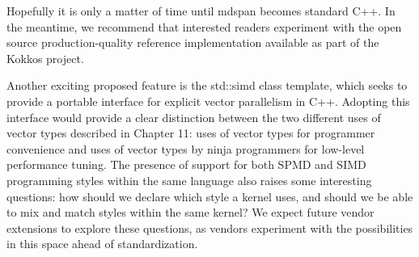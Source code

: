 Hopefully it is only a matter of time until mdspan becomes standard C++. In the meantime, we recommend that interested readers experiment with the open source production-quality reference implementation available as part of the Kokkos project.\par

Another exciting proposed feature is the std::simd class template, which seeks to provide a portable interface for explicit vector parallelism in C++. Adopting this interface would provide a clear distinction between the two different uses of vector types described in Chapter 11: uses of vector types for programmer convenience and uses of vector types by ninja programmers for low-level performance tuning. The presence of support for both SPMD and SIMD programming styles within the same language also raises some interesting questions: how should we declare which style a kernel uses, and should we be able to mix and match styles within the same kernel? We expect future vendor extensions to explore these questions, as vendors experiment with the possibilities in this space ahead of standardization.\par


















